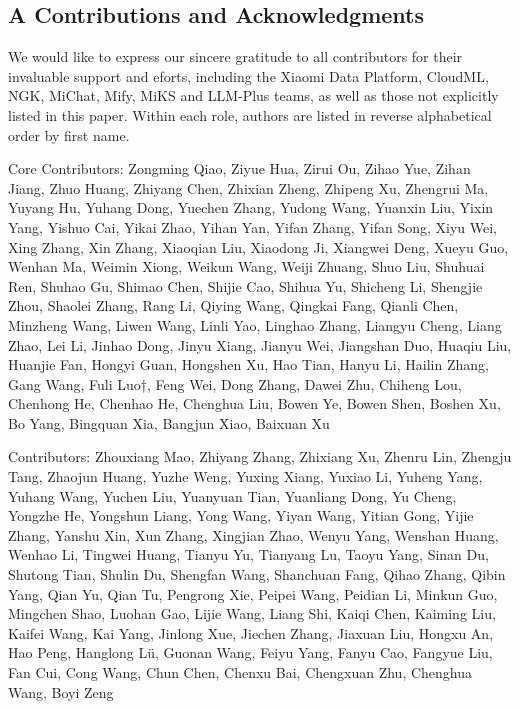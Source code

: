 \documentclass[
  10
]{article}
\begin{document}
\subsection{A Contributions and
Acknowledgments}\label{a-contributions-and-acknowledgments}

We would like to express our sincere gratitude to all contributors for
their invaluable support and eforts, including the Xiaomi Data Platform,
CloudML, NGK, MiChat, Mify, MiKS and LLM-Plus teams, as well as those
not explicitly listed in this paper. Within each role, authors are
listed in reverse alphabetical order by first name.

Core Contributors: Zongming Qiao, Ziyue Hua, Zirui Ou, Zihao Yue, Zihan
Jiang, Zhuo Huang, Zhiyang Chen, Zhixian Zheng, Zhipeng Xu, Zhengrui Ma,
Yuyang Hu, Yuhang Dong, Yuechen Zhang, Yudong Wang, Yuanxin Liu, Yixin
Yang, Yishuo Cai, Yikai Zhao, Yihan Yan, Yifan Zhang, Yifan Song, Xiyu
Wei, Xing Zhang, Xin Zhang, Xiaoqian Liu, Xiaodong Ji, Xiangwei Deng,
Xueyu Guo, Wenhan Ma, Weimin Xiong, Weikun Wang, Weiji Zhuang, Shuo Liu,
Shuhuai Ren, Shuhao Gu, Shimao Chen, Shijie Cao, Shihua Yu, Shicheng Li,
Shengjie Zhou, Shaolei Zhang, Rang Li, Qiying Wang, Qingkai Fang, Qianli
Chen, Minzheng Wang, Liwen Wang, Linli Yao, Linghao Zhang, Liangyu
Cheng, Liang Zhao, Lei Li, Jinhao Dong, Jinyu Xiang, Jianyu Wei,
Jiangshan Duo, Huaqiu Liu, Huanjie Fan, Hongyi Guan, Hongshen Xu, Hao
Tian, Hanyu Li, Hailin Zhang, Gang Wang, Fuli Luo†, Feng Wei, Dong
Zhang, Dawei Zhu, Chiheng Lou, Chenhong He, Chenhao He, Chenghua Liu,
Bowen Ye, Bowen Shen, Boshen Xu, Bo Yang, Bingquan Xia, Bangjun Xiao,
Baixuan Xu

Contributors: Zhouxiang Mao, Zhiyang Zhang, Zhixiang Xu, Zhenru Lin,
Zhengju Tang, Zhaojun Huang, Yuzhe Weng, Yuxing Xiang, Yuxiao Li, Yuheng
Yang, Yuhang Wang, Yuchen Liu, Yuanyuan Tian, Yuanliang Dong, Yu Cheng,
Yongzhe He, Yongshun Liang, Yong Wang, Yiyan Wang, Yitian Gong, Yijie
Zhang, Yanshu Xin, Xun Zhang, Xingjian Zhao, Wenyu Yang, Wenshan Huang,
Wenhao Li, Tingwei Huang, Tianyu Yu, Tianyang Lu, Taoyu Yang, Sinan Du,
Shutong Tian, Shulin Du, Shengfan Wang, Shanchuan Fang, Qihao Zhang,
Qibin Yang, Qian Yu, Qian Tu, Pengrong Xie, Peipei Wang, Peidian Li,
Minkun Guo, Mingchen Shao, Luohan Gao, Lijie Wang, Liang Shi, Kaiqi
Chen, Kaiming Liu, Kaifei Wang, Kai Yang, Jinlong Xue, Jiechen Zhang,
Jiaxuan Liu, Hongxu An, Hao Peng, Hanglong Lü, Guonan Wang, Feiyu Yang,
Fanyu Cao, Fangyue Liu, Fan Cui, Cong Wang, Chun Chen, Chenxu Bai,
Chengxuan Zhu, Chenghua Wang, Boyi Zeng
\end{document}
